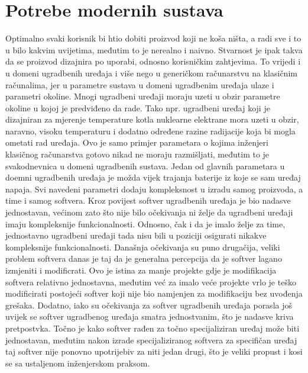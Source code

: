 \section{Potrebe modernih sustava}
Optimalno svaki korisnik bi htio dobiti proizvod koji ne koša ništa, a radi sve i to u bilo kakvim uvijetima, međutim to je nerealno i naivno. Stvarnost je ipak takva da se proizvod dizajnira po uporabi, odnosno korisničkim zahtjevima. To vrijedi i u domeni ugradbenih uređaja i više nego u generičkom računarstvu na klasičnim računalima, jer u parametre sustava u domeni ugradbenim uređaja ulaze i parametri okoline. Mnogi ugradbeni uređaji moraju uzeti u obzir parametre okoline u kojoj je predviđeno da rade. Tako npr. ugradbeni uređaj koji je dizajniran za mjerenje temperature kotla nuklearne elektrane mora uzeti u obzir, naravno, visoku temperaturu i dodatno određene razine radijacije koja bi mogla ometati rad uređaja. Ovo je samo primjer parametara o kojima inženjeri klasičnog računarstva gotovo nikad ne moraju razmišljati, međutim to je svakodnevnica u domeni ugradbenih sustava. Jedan od glavnih parametara u doemni ugradbenih uređaja je možda vijek trajanja baterije iz koje se sam uređaj napaja. Svi navedeni parametri dodaju kompleksnost u izradu samog proizvoda, a time i samog softvera. Kroz povijest softver ugradbenih uređaja je bio nadasve jednostavan, većinom zato što nije bilo očekivanja ni želje da ugradbeni uređaji imaju kompleksnije funkcionalnosti. Odnosno, čak i da je imalo želje za time, jednostavno ugradbeni uređaji tada nisu bili u poziciji osigurati nikakve kompleksnije funkcionalnosti. Današnja očekivanja su puno drugačija, veliki problem softvera danas je taj da je generalna percepcija da je softver lagano izmjeniti i modificrati. Ovo je istina za manje projekte gdje je modifikacija softvera relativno jednostavna, međutim već za imalo veće projekte vrlo je teško modificirati postojeći softver koji nije bio namjenjen za modifikaciju bez uvođenja grešaka. Dodatno, iako su očekivanja za softver ugradbenih uređaja porasla još uvijek se softver ugradbenog uređaja smatra jednostvanim, što je nadasve kriva pretpostvka. Točno je kako softver rađen za točno specijaliziran uređaj može biti jednostavan, međutim nakon izrade specijaliziranog softvera za specifičan uređaj taj softver nije ponovno upotrijebiv za niti jedan drugi, što je veliki propust i kosi se sa ustaljenom inženjerskom praksom. \\
